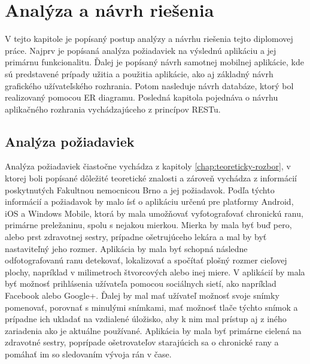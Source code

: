 \chapter{Analýza a návrh riešenia}
\label{chap:analyza-navrh-riesenia}
V tejto kapitole je popísaný postup analýzy a návrhu riešenia tejto diplomovej práce. Najprv je popísaná analýza požiadaviek na výslednú aplikáciu a jej primárnu funkcionalitu. Ďalej je popísaný návrh samotnej mobilnej aplikácie, kde sú predstavené prípady užitia a použitia aplikácie, ako aj základný návrh grafického užívateľského rozhrania. Potom nasleduje návrh databáze, ktorý bol realizovaný pomocou ER diagramu. Posledná kapitola pojednáva o návrhu aplikačného rozhrania vychádzajúceho z princípov RESTu.

\section{Analýza požiadaviek}
Analýza požiadaviek čiastočne vychádza z kapitoly \ref{chap:teoreticky-rozbor}, v ktorej boli popísané dôležité teoretické znalosti a zároveň vychádza z informácií poskytnutých Fakultnou nemocnicou Brno a jej požiadavok. Podľa týchto informácií a požiadavok by malo ísť o aplikáciu určenú pre platformy Android, iOS a Windows Mobile, ktorá by mala umožňovať vyfotografovať chronickú ranu, primárne preležaninu, spolu s nejakou mierkou. Mierka by mala byť buď pero, alebo prst zdravotnej sestry, prípadne ošetrujúceho lekára a mal by byť nastaviteľný jeho rozmer. Aplikácia by mala byť schopná následne odfotografovanú ranu detekovať, lokalizovať a spočítať plošný rozmer cieľovej plochy, napríklad v milimetroch štvorcových alebo inej miere. V aplikácií by mala byť možnosť prihlásenia užívateľa pomocou sociálnych sietí, ako napríklad Facebook alebo Google+. Ďalej by mal mať užívateľ možnosť svoje snímky pomenovať, porovnať s minulými snímkami, mať možnosť tlače týchto snímok a prípadne ich ukladať na vzdialené úložisko, aby k nim mal prístup aj z iného zariadenia ako je aktuálne používané. Aplikácia by mala byť primárne cielená na zdravotné sestry, poprípade ošetrovateľov starajúcich sa o chronické rany a pomáhať im so sledovaním vývoja rán v čase. 

